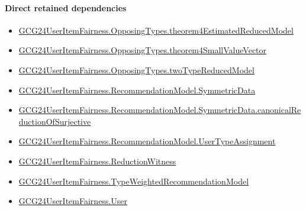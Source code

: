 \documentclass[10pt]{article}
\begin{document}
\paragraph{Direct retained dependencies}
\begin{itemize}\raggedright
\item \hyperlink{governing-declaration-4861612962fb5ac5}{GCG24\allowbreak{}User\allowbreak{}Item\allowbreak{}Fairness.\allowbreak{}Opposing\allowbreak{}Types.\allowbreak{}theorem4\allowbreak{}Estimated\allowbreak{}Reduced\allowbreak{}Model}
\item \hyperlink{governing-declaration-0f0ce0e25d4f2475}{GCG24\allowbreak{}User\allowbreak{}Item\allowbreak{}Fairness.\allowbreak{}Opposing\allowbreak{}Types.\allowbreak{}theorem4\allowbreak{}Small\allowbreak{}Value\allowbreak{}Vector}
\item \hyperlink{governing-declaration-b87168913e966e7f}{GCG24\allowbreak{}User\allowbreak{}Item\allowbreak{}Fairness.\allowbreak{}Opposing\allowbreak{}Types.\allowbreak{}two\allowbreak{}Type\allowbreak{}Reduced\allowbreak{}Model}
\item \hyperlink{governing-declaration-5bf2c3489c614d0a}{GCG24\allowbreak{}User\allowbreak{}Item\allowbreak{}Fairness.\allowbreak{}Recommendation\allowbreak{}Model.\allowbreak{}Symmetric\allowbreak{}Data}
\item \hyperlink{governing-declaration-74d9be2e84dd2134}{GCG24\allowbreak{}User\allowbreak{}Item\allowbreak{}Fairness.\allowbreak{}Recommendation\allowbreak{}Model.\allowbreak{}Symmetric\allowbreak{}Data.\allowbreak{}canonical\allowbreak{}Reduction\allowbreak{}Of\allowbreak{}Surjective}
\item \hyperlink{governing-declaration-ff90b1efab93f1aa}{GCG24\allowbreak{}User\allowbreak{}Item\allowbreak{}Fairness.\allowbreak{}Recommendation\allowbreak{}Model.\allowbreak{}User\allowbreak{}Type\allowbreak{}Assignment}
\item \hyperlink{governing-declaration-09e04866bceb3cdb}{GCG24\allowbreak{}User\allowbreak{}Item\allowbreak{}Fairness.\allowbreak{}Reduction\allowbreak{}Witness}
\item \hyperlink{governing-declaration-9d0d71ba8ee67837}{GCG24\allowbreak{}User\allowbreak{}Item\allowbreak{}Fairness.\allowbreak{}Type\allowbreak{}Weighted\allowbreak{}Recommendation\allowbreak{}Model}
\item \hyperlink{governing-declaration-800dd691bc989470}{GCG24\allowbreak{}User\allowbreak{}Item\allowbreak{}Fairness.\allowbreak{}User}
\end{itemize}
\end{document}
